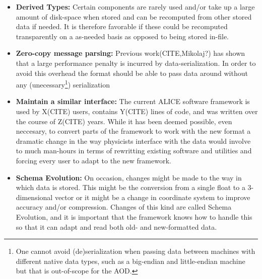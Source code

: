 \documentclass{report}
\begin{document}
\begin{itemize}
  \item {\bf Derived Types:} Certain components are rarely used and/or take up a large amount of disk-space when stored and can be recomputed from other stored data if needed.
  It is therefore favorable if these could be recomputed transparently on a as-needed basis as opposed to being stored in-file.
  \item {\bf Zero-copy message parsing:} Previous work(CITE,Mikolaj?) has shown that a large performance penalty is incurred by data-serialization. In order to avoid this overhead the
  format should be able to pass data around without any
  (unecessary\footnote{One cannot avoid (de)serialization when passing data between machines with different native data types, such as a big-endian
   and little-endian machine but that is out-of-scope for the AOD.}) serialization
  \item {\bf Maintain a similar interface:} The  current ALICE software framework is used by X(CITE) users, contains Y(CITE) lines of code, and was written over the course of
  Z(CITE) years. While it has been deemed possible, even neccesary, to convert parts of the framework to work with the new format a dramatic change in the way physicists interface
  with the data would involve to much man-hours in terms of rewritting existing software and utilities and forcing every user to adapt to the new framework.
  \item {\bf Schema Evolution:} On occasion, changes might be made to the way in which data is stored. This might be the conversion from a single float to a 3-dimensional vector or it might
  be a change in coordinate system to improve accuracy and/or compression. Changes of this kind are called Schema Evolution, and it is important that the framework knows how to handle this so
  that it can adapt and read both old- and new-formatted data.
\end{itemize}
\end{document}
